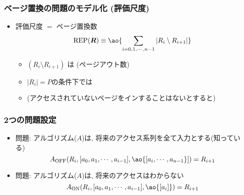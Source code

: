 \documentclass[12pt,dvipdfmx]{beamer}
\begin{document}
\begin{frame}
  \frametitle{ページ置換の問題のモデル化 (評価尺度)}
  \begin{itemize}
  \item 評価尺度 $=$ ページ置換数
    \[ \mbox{REP}({\boldsymbol{R}}) \equiv \ao{\sum_{i=0,1,\cdots, n-1} |R_i \setminus R_{i+1}|} \]
    \begin{itemize}
    \item $(R_i \setminus R_{i+1})$ は (ページアウト数)
    \item $|R_i| = P$の条件下では
    \item (アクセスされていないページをインすることはないとすると) 
    \end{itemize}
  \end{itemize}

  \begin{center}
    \def\svgwidth{\textwidth}
    {\scriptsize}
  \end{center}
\end{frame}

\begin{frame}
  \frametitle{2つの問題設定}
  \begin{itemize}
  \item<1-> 問題:
    アルゴリズム($A$)は, 将来のアクセス系列を全て入力とする(知っている)
    \[ A_{\mbox{\scriptsize OFF}}(R_i, [a_0, a_1, \cdots , a_{i-1}], \ao{[a_i, \cdots , a_{n-1}}]) = R_{i+1} \]
  \item<2-> 問題:
    アルゴリズム($A$)は, 将来のアクセスはわからない
    \[ A_{\mbox{\scriptsize ON}}(R_i, [a_0, a_1, \cdots , a_{i-1}], \ao{[a_i]}) = R_{i+1} \]
  \end{itemize}

  \begin{center}
    \def\svgwidth{0.8\textwidth}
  \end{center}
\end{frame}
\end{document}

